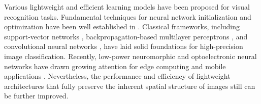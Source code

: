 \documentclass[pdflatex,sn-mathphys-num]{sn-jnl}%
\theoremstyle{thmstyleone}%
\theoremstyle{thmstyletwo}%
\theoremstyle{thmstylethree}%
\begin{document}
Various lightweight and efficient learning models have been proposed for visual recognition tasks.
Fundamental techniques for neural network initialization and optimization have been well established in \cite{xavier_glorot, he_init, kingma2014adam}.
Classical frameworks, including support-vector networks \cite{Cortes1995}, backpropagation-based multilayer perceptrons \cite{Rumelhart1986}, and convolutional neural networks \cite{LeCun1998,Krizhevsky2012}, have laid solid foundations for high-precision image classification.
Recently, low-power neuromorphic and optoelectronic neural networks have drawn growing attention for edge computing and mobile applications \cite{Zhu2022, Beyeler2013, Song2024}.
Nevertheless, the performance and efficiency of lightweight architectures that fully preserve the inherent spatial structure of images still can be further improved.
\end{document}
